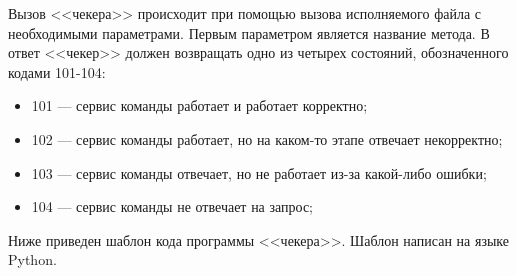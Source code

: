 Вызов <<чекера>> происходит при помощью вызова исполняемого файла с необходимыми параметрами. Первым параметром является название метода. 
В ответ <<чекер>> должен возвращать одно из четырех состояний, обозначенного кодами 101-104:
\begin{itemize}
\item 101 --- сервис команды работает и работает корректно;
\item 102 --- сервис команды работает, но на каком-то этапе отвечает некорректно;
\item 103 --- сервис команды отвечает, но не работает из-за какой-либо ошибки; 
\item 104 --- сервис команды не отвечает на запрос;
\end{itemize}


\clearpage
Ниже приведен шаблон кода программы <<чекера>>. Шаблон написан на языке Python.




\clearpage